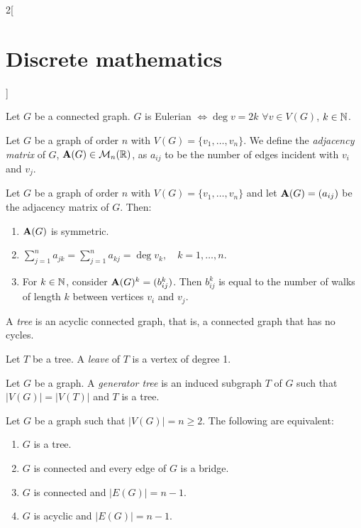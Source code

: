 \documentclass[../../../main.tex]{subfiles}
\begin{document}
\begin{multicols}{2}[\section{Discrete mathematics}]
\begin{definition}
  \end{definition}
  \begin{theorem}
    Let $G$ be a connected graph. $G$ is Eulerian $\iff\deg v=2k$ $\forall v\in V(G)$, $k\in\mathbb{N} $.
  \end{theorem}
  \begin{definition}
    Let $G$ be a graph of order $n$ with $V(G)=\{v_1,\ldots,v_n\}$. We define the \emph{adjacency matrix} of $G$, $\boldsymbol{\mathrm{A}}(G)\in\mathcal{M}_n(\mathbb{R} )$, as $a_{ij}$ to be the number of edges incident with $v_i$ and $v_j$.
  \end{definition}
  \begin{proposition}
    Let $G$ be a graph of order $n$ with $V(G)=\{v_1,\ldots,v_n\}$ and let $\boldsymbol{\mathrm{A}}(G)=(a_{ij})$ be the adjacency matrix of $G$. Then:
    \begin{enumerate}
      \item $\boldsymbol{\mathrm{A}}(G)$ is symmetric.
      \item $\displaystyle\sum_{j=1}^n a_{jk}=\sum_{j=1}^n a_{kj}=\deg v_k,\quad k=1,\ldots,n$.
      \item For $k\in\mathbb{N} $, consider $\boldsymbol{\mathrm{A}}(G)^k=(b_{ij}^k)$. Then $b_{ij}^k$ is equal to the number of walks of length $k$ between vertices $v_i$ and $v_j$.
    \end{enumerate}
  \end{proposition}
  \begin{definition}
    A \emph{tree} is an acyclic connected graph, that is, a connected graph that has no cycles.
  \end{definition}
  \begin{definition}
    Let $T$ be a tree. A \emph{leave} of $T$ is a vertex of degree 1.
  \end{definition}
  \begin{definition}
    Let $G$ be a graph. A \emph{generator tree} is an induced subgraph $T$ of $G$ such that $|V(G)|=|V(T)|$ and $T$ is a tree.
  \end{definition}
  \begin{proposition}
    Let $G$ be a graph such that $|V(G)|=n\geq 2$. The following are equivalent:
    \begin{enumerate}
      \item $G$ is a tree.
      \item $G$ is connected and every edge of $G$ is a bridge.
      \item $G$ is connected and $|E(G)|=n-1$.
      \item $G$ is acyclic and $|E(G)|=n-1$.

\end{enumerate}
\end{proposition}
\end{multicols}
\end{document}
